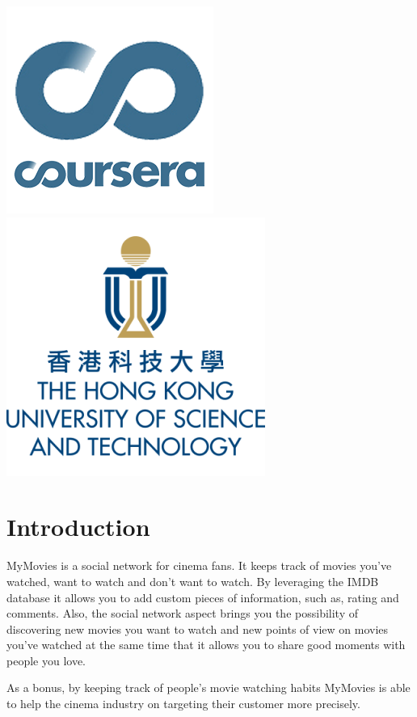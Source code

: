 \begin{titlepage}
\vfill
\includegraphics[width=.2\paperwidth]{fig/coursera.png}
\hspace{2cm}
\includegraphics[width=.2\paperwidth]{fig/hkust.png}

\end{titlepage}

\section{Introduction}

MyMovies is a social network for cinema fans. It keeps track of movies you've
watched, want to watch and don't want to watch. By leveraging the IMDB database
it allows you to add custom pieces of information, such as, rating and
comments. Also, the social network aspect brings you the possibility of
discovering new movies you want to watch and new points of view on movies
you've watched at the same time that it allows you to share good moments with
people you love.

As a bonus, by keeping track of people's movie watching habits MyMovies is able
to help the cinema industry on targeting their customer more precisely.

